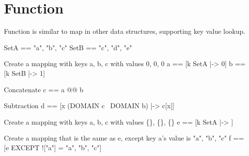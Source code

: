 \section{Function}

Function is similar to map in other data structures, supporting key value
lookup.\\

\begin{tla}
SetA == {"a", "b", "c"}
SetB == {"c", "d", "e"}

\* Create a mapping with keys a, b, c with values 0, 0, 0
a == [k \in SetA |-> 0]
b == [k \in SetB |-> 1]

\* Concatenate 
c == a @@ b

\* Subtraction
d == [x \in (DOMAIN c \ DOMAIN b) |-> c[x]]

\* Create a mapping with keys a, b, c with values \{\}, \{\}, \{\}
e == [k \in SetA |-> {}]

\* Create a mapping that is the same as e, except key a's value is {"a", "b", "c"}
f == [e EXCEPT !["a"] = {"a", "b", "c"}] 

\end{tla}
\begin{tlatex}
%
%
\@pvspace{8.0pt}%
\@x{}%
%
\@xx{}%
%
%
\@pvspace{8.0pt}%
\@x{}%
%
\@xx{}%
%
\@pvspace{8.0pt}%
\@x{}%
%
\@xx{}%
\@pvspace{8.0pt}%
\@x{}%
%
\@xx{}%
%
\@pvspace{8.0pt}%
\@x{}%
%
\@xx{}%
\@pvspace{8.0pt}%
\end{tlatex}
